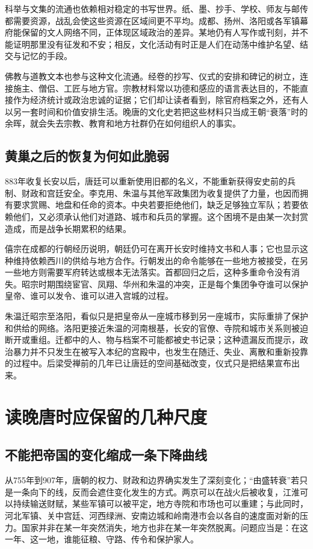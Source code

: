 科举与文集的流通也依赖相对稳定的书写世界。纸、墨、抄手、学校、师友与邮传都需要资源，战乱会使这些资源在区域间更不平均。成都、扬州、洛阳或各军镇幕府能保留的文人网络不同，正体现区域政治的差异。某地仍有人写作或刊刻，并不能证明那里没有征发和不安；相反，文化活动有时正是人们在动荡中维护名望、结交与记忆的手段。

佛教与道教文本也参与这种文化流通。经卷的抄写、仪式的安排和碑记的树立，连接施主、僧侣、工匠与地方官。宗教材料常以功德和感应的语言表达目的，不能直接作为经济统计或政治忠诚的证据；它们却让读者看到，除官府档案之外，还有人以另一套时间和价值安排生活。晚唐的文化史若把这些材料只当成王朝“衰落”时的余晖，就会失去宗教、教育和地方社群仍在如何组织人的事实。

\subsection{黄巢之后的恢复为何如此脆弱}
883年收复长安以后，唐廷可以重新使用旧都的名义，不能重新获得安史前的兵制、财政和宫廷安全。李克用、朱温与其他军政集团为收复提供了力量，也因而拥有要求赏赐、地盘和任命的资本。中央若要拒绝他们，缺乏足够独立军队；若要依赖他们，又必须承认他们对道路、城市和兵员的掌握。这个困境不是由某一次封赏造成，而是战争长期累积的结果。

僖宗在成都的行朝经历说明，朝廷仍可在离开长安时维持文书和人事；它也显示这种维持依赖西川的供给与地方合作。行朝发出的命令能够在一些地方被接受，在另一些地方则需要军府转达或根本无法落实。首都回归之后，这种多重命令没有消失。昭宗时期围绕宦官、凤翔、华州和朱温的冲突，正是每个集团争夺谁可以保护皇帝、谁可以发令、谁可以进入宫城的过程。

朱温迁昭宗至洛阳，看似只是把皇帝从一座城市移到另一座城市，实际重排了保护和供给的网络。洛阳更接近朱温的河南根基，长安的官僚、寺院和城市关系则被迫断开或重组。迁都中的人、物与档案不可能都被史书记录；这种遗漏反而提示，政治暴力并不只发生在被写入本纪的宫殿中，也发生在随迁、失业、离散和重新投靠的过程中。后梁受禅前的几年已让唐廷的空间基础改变，仪式只是把结果宣布出来。

\section{读晚唐时应保留的几种尺度}

\subsection{不能把帝国的变化缩成一条下降曲线}
从755年到907年，唐朝的权力、财政和边界确实发生了深刻变化；“由盛转衰”若只是一条向下的线，反而会遮住变化发生的方式。两京可以在战火后被收复，江淮可以持续输送财赋，某些军镇可以被平定，地方寺院和市场也可以重建；与此同时，河北军镇、关中宫廷、河西绿洲、安南边城和岭南港市会以各自的速度面对新的压力。国家并非在某一年突然消失，地方也非在某一年突然脱离。问题应当是：在这一年、这一地，谁能征粮、守路、传令和保护家人。

